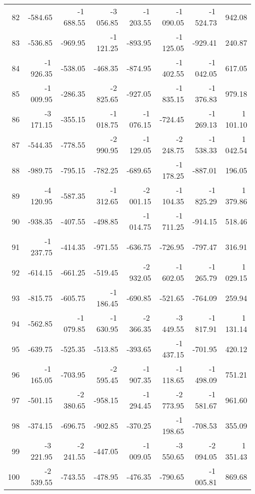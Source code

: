 \begin{longtable}{rrrrrrrr}
82 & -584.65 & -1\,688.55 & -3\,056.85 & -1\,203.55 & -1\,090.05 & -1\,524.73 & 942.08  \\
83 & -536.85 & -969.95 & -1\,121.25 & -893.95 & -1\,125.05 & -929.41 & 240.87  \\
84 & -1\,926.35 & -538.05 & -468.35 & -874.95 & -1\,402.55 & -1\,042.05 & 617.05  \\
85 & -1\,009.95 & -286.35 & -2\,825.65 & -927.05 & -1\,835.15 & -1\,376.83 & 979.18  \\
86 & -3\,171.15 & -355.15 & -1\,018.75 & -1\,076.15 & -724.45 & -1\,269.13 & 1\,101.10  \\
87 & -544.35 & -778.55 & -2\,990.95 & -1\,129.05 & -2\,248.75 & -1\,538.33 & 1\,042.54  \\
88 & -989.75 & -795.15 & -782.25 & -689.65 & -1\,178.25 & -887.01 & 196.05  \\
89 & -4\,120.95 & -587.35 & -1\,312.65 & -2\,001.15 & -1\,104.35 & -1\,825.29 & 1\,379.86  \\
90 & -938.35 & -407.55 & -498.85 & -1\,014.75 & -1\,711.25 & -914.15 & 518.46  \\
91 & -1\,237.75 & -414.35 & -971.55 & -636.75 & -726.95 & -797.47 & 316.91  \\
92 & -614.15 & -661.25 & -519.45 & -2\,932.05 & -1\,602.05 & -1\,265.79 & 1\,029.15  \\
93 & -815.75 & -605.75 & -1\,186.45 & -690.85 & -521.65 & -764.09 & 259.94  \\
94 & -562.85 & -1\,079.85 & -1\,630.95 & -2\,366.35 & -3\,449.55 & -1\,817.91 & 1\,131.14  \\
95 & -639.75 & -525.35 & -513.85 & -393.65 & -1\,437.15 & -701.95 & 420.12  \\
96 & -1\,165.05 & -703.95 & -2\,595.45 & -1\,907.35 & -1\,118.65 & -1\,498.09 & 751.21  \\
97 & -501.15 & -2\,380.65 & -958.15 & -1\,294.45 & -2\,773.95 & -1\,581.67 & 961.60  \\
98 & -374.15 & -696.75 & -902.85 & -370.25 & -1\,198.65 & -708.53 & 355.09  \\
99 & -3\,221.95 & -2\,241.55 & -447.05 & -1\,009.05 & -3\,550.65 & -2\,094.05 & 1\,351.43  \\
100 & -2\,539.55 & -743.55 & -478.95 & -476.35 & -790.65 & -1\,005.81 & 869.68  \\

\end{longtable}

